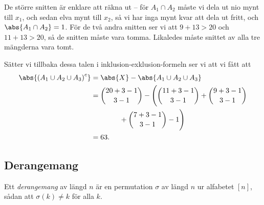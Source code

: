 \documentclass[nobib]{tufte-handout}
\begin{document}
\begin{example}
  De större snitten är enklare att räkna ut -- för $A_1\cap A_2$ måste vi dela ut nio mynt till $x_1$, och sedan elva mynt till $x_2$, så vi har inga mynt kvar att dela ut fritt, och $\abs{A_1 \cap A_2} = 1$. För de två andra snitten ser vi att $9 + 13 > 20$ och $11 + 13 > 20$, så de snitten måste vara tomma. Likaledes måste snittet av alla tre mängderna vara tomt.

  Sätter vi tillbaka dessa talen i inklusion-exklusion-formeln ser vi att vi fått att
  \begin{align*}
    \abs{\left(A_1 \cup A_2 \cup A_3\right)^c} &= \abs{X} - \abs{A_1 \cup A_2 \cup A_3}\\
    &= \binom{20 + 3 - 1}{3 - 1} - \Bigg(\binom{11+3-1}{3-1}+ \binom{9+3-1}{3-1}\\
    &\qquad\qquad + \binom{7+3-1}{3-1}- 1\Bigg)\\
    &= 63.
  \end{align*}
\end{example}

\subsection{Derangemang}

\begin{definition}
  Ett \emph{derangemang} av längd $n$ är en permutation $\sigma$ av längd $n$ ur alfabetet $[n]$, sådan att $\sigma(k) \neq k$ för alla $k$.
\end{definition}
\end{document}

